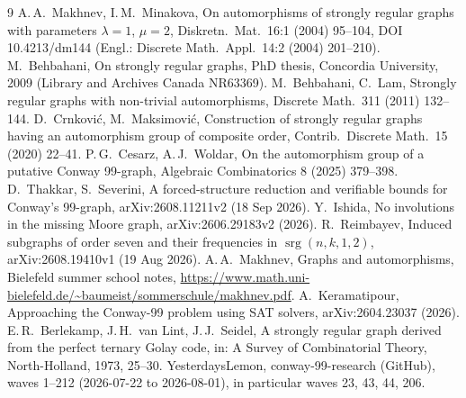 \documentclass[11pt,a4paper]{article}
\theoremstyle{remark}
\newcommand{\srg}{\operatorname{srg}}
\begin{document}
\begin{thebibliography}{9}
 A.\,A.~Makhnev, I.\,M.~Minakova, On automorphisms of strongly regular graphs with parameters $\lambda=1$, $\mu=2$, Diskretn.\ Mat.\ 16:1 (2004) 95--104, DOI 10.4213/dm144 (Engl.: Discrete Math.\ Appl.\ 14:2 (2004) 201--210).
 M.~Behbahani, On strongly regular graphs, PhD thesis, Concordia University, 2009 (Library and Archives Canada NR63369).
 M.~Behbahani, C.~Lam, Strongly regular graphs with non-trivial automorphisms, Discrete Math.\ 311 (2011) 132--144.
 D.~Crnković, M.~Maksimović, Construction of strongly regular graphs having an automorphism group of composite order, Contrib.\ Discrete Math.\ 15 (2020) 22--41.
 P.\,G.~Cesarz, A.\,J.~Woldar, On the automorphism group of a putative Conway 99-graph, Algebraic Combinatorics 8 (2025) 379--398.
 D.~Thakkar, S.~Severini, A forced-structure reduction and verifiable bounds for Conway's 99-graph, arXiv:2608.11211v2 (18 Sep 2026).
 Y.~Ishida, No involutions in the missing Moore graph, arXiv:2606.29183v2 (2026).
 R.~Reimbayev, Induced subgraphs of order seven and their frequencies in $\srg(n,k,1,2)$, arXiv:2608.19410v1 (19 Aug 2026).
 A.\,A.~Makhnev, Graphs and automorphisms, Bielefeld summer school notes, \url{https://www.math.uni-bielefeld.de/~baumeist/sommerschule/makhnev.pdf}.
 A.~Keramatipour, Approaching the Conway-99 problem using SAT solvers, arXiv:2604.23037 (2026).
 E.\,R.~Berlekamp, J.\,H.~van Lint, J.\,J.~Seidel, A strongly regular graph derived from the perfect ternary Golay code, in: A Survey of Combinatorial Theory, North-Holland, 1973, 25--30.
 YesterdaysLemon, conway-99-research (GitHub), waves 1--212 (2026-07-22 to 2026-08-01), in particular waves 23, 43, 44, 206.
\end{thebibliography}
\end{document}
